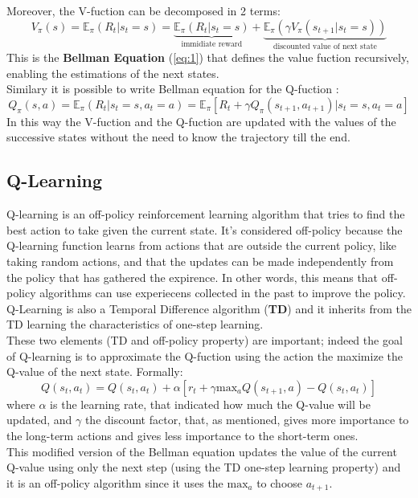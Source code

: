 \documentclass[14pt]{extarticle}
\def\sp{\vspace{5pt}}
\def\ppn{\vspace{10pt}}
\begin{document}
\begin{flushleft}
\ppn
Moreover, the V-fuction can be decomposed in 2 terms:
\begin{equation} \label{eq:1}
V_{\pi}(s) = \mathbb{E}_{\pi}(R_t|s_t=s) = 
					\underbrace{\mathbb{E}_{\pi}(R_{t}|s_t=s)}_{\text{immidiate reward}} + 
					\underbrace{\mathbb{E}_{\pi}(\gamma V_{\pi}(s_{t+1}|s_t=s))}_{\text{discounted value of next state}}
\end{equation}
This is the \textbf{Bellman Equation} (\ref{eq:1}) that defines the value fuction recursively, enabling the estimations of the next states. \\
Similary it is possible to write Bellman equation for the Q-fuction :
\[Q_{\pi}(s,a) = \mathbb{E}_{\pi}(R_t|s_t=s, a_t=a) = \mathbb{E}_{\pi}[R_t + \gamma Q_{\pi}(s_{t+1},a_{t+1})| s_t=s, a_t=a] \]
In this way the V-fuction and the  Q-fuction are updated with the values of the successive states without the need to know the trajectory till the end.

\subsection{Q-Learning}
\sp
Q-learning is an off-policy reinforcement learning algorithm that tries to find the best action to take given the current state. It's considered off-policy because the Q-learning function learns from actions that are outside the current policy, like taking random actions, and that the updates can be made independently from the policy that has gathered the expirence. In other words, this means that off-policy algorithms can use experiecens collected in the past to improve the policy.\\
Q-Learning is also a Temporal Difference algorithm (\textbf{TD}\cite{TDl}) and it inherits from the TD learning the characteristics of one-step learning.\\
These two elements (TD and off-policy property) are important; indeed the goal of Q-learning is to approximate the Q-fuction using the action the maximize the Q-value of the next state. Formally:
\begin{equation} \label{eq:2}
 Q(s_t,a_t) = Q(s_t,a_t) + 
\alpha[r_t + \gamma \text{max}_{a}Q(s_{t+1},a) - Q(s_t,a_t)] 
\end{equation}
where $\alpha$ is the learning rate, that indicated how much the Q-value will be updated, and $\gamma$ the discount factor, that, as mentioned, gives more importance to the long-term actions and gives less importance to the short-term ones. \\
This modified version of the Bellman equation updates the value of the current Q-value using only the next step (using the TD one-step learning property) and it is an off-policy 
algorithm since it uses the $\text{max}_{a}$ to choose $a_{t+1}$.


\end{flushleft}
\end{document}
